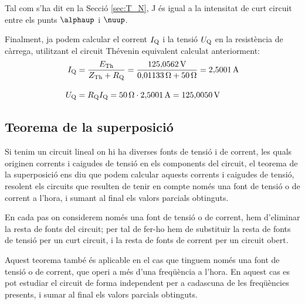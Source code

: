 \begin{exemple}
Tal com s'ha dit en la Secci\'{o} \ref{sec:T_N}, J \'{e}s igual a la
intensitat de curt circuit entre els punts $\alphaup$ i $\nuup$.

Finalment, ja podem calcular el corrent $I_\mathrm{Q}$ i la tensi\'{o} $U_\mathrm{Q}$ en la
resist\`{e}ncia de c\`{a}rrega, utilitzant el circuit Th\'{e}venin equivalent calculat anteriorment:
\begin{align*}
    I_\mathrm{Q} &= \frac{E_\mathrm{Th}}{Z_\mathrm{Th} + R_\mathrm{Q}} = \frac{125{,}0562\mathrm{\,V}}
    {0{,}01133\mathrm{\,\mathrm{\Omega}} + 50\mathrm{\,\mathrm{\Omega}}} = 2{,}5001\mathrm{\,A} \\[2ex]
    U_\mathrm{Q} &=  R_\mathrm{Q} I_\mathrm{Q} = 50\mathrm{\,\mathrm{\Omega}} \cdot 2{,}5001\mathrm{\,A} =
    125{,}0050\mathrm{\,V}
\end{align*}

\end{exemple}

\subsection{Teorema de la superposici\'{o}}

Si tenim un circuit lineal on hi ha diverses fonts de tensi\'{o} i  de
corrent, les quals originen corrents i caigudes de tensi\'{o} en els
components del circuit, el teorema de la superposici\'{o} ens diu que
podem calcular aquests corrents i caigudes de tensi\'{o}, resolent els
circuits que resulten de tenir en compte  nom\'{e}s una font de tensi\'{o} o
de corrent a l'hora, i sumant al final els valors parcials
obtinguts.

En cada pas on considerem nom\'{e}s una font de tensi\'{o} o de corrent, hem
d'eliminar la resta de fonts del circuit; per tal de fer-ho hem de
substituir la resta de fonts de tensi\'{o} per un curt circuit, i la
resta de fonts de corrent per un circuit obert.

Aquest teorema tamb\'{e} \'{e}s aplicable en el cas que tinguem nom\'{e}s una
font de tensi\'{o} o de corrent, que operi a m\'{e}s d'una freq\"{u}\`{e}ncia a
l'hora. En aquest cas es pot estudiar el circuit de forma
independent per a cadascuna de les freq\"{u}\`{e}ncies presents, i sumar al
final els valors parcials obtinguts.

